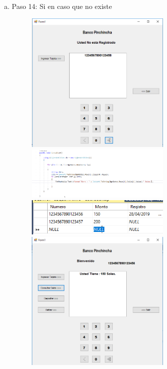 \begin{enumerate}[1.]
\begin{enumerate}[a)]
\begin{figure}[H]
\begin{center}
		\end{center}
		\end{figure}
	\item Paso 14: Si en caso que no existe
		\begin{figure}[H]
		\begin{center}
		\includegraphics[width=7cm]{./Imagenes/img15}\\

		\includegraphics[width=7cm]{./Imagenes/img16}\\

		\includegraphics[width=7cm]{./Imagenes/img17}\\

		\includegraphics[width=7cm]{./Imagenes/img18}\\


\end{center}
\end{figure}
\end{enumerate}
\end{enumerate}

